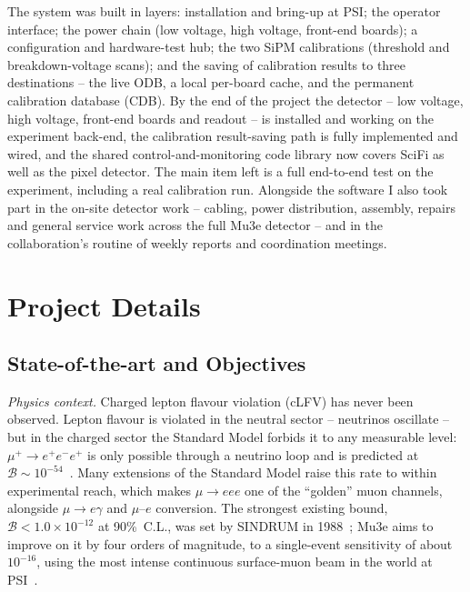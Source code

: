 \documentclass[12pt,a4paper]{article}
\newcommand{\pill}[1]{\textit{#1}\;}   %
\begin{document}
The system was built in layers: installation and bring-up at PSI; the operator
interface; the power chain (low voltage, high voltage, front-end boards); a
configuration and hardware-test hub; the two SiPM calibrations (threshold and
breakdown-voltage scans); and the saving of calibration results to three
destinations -- the live ODB, a local per-board cache, and the permanent
calibration database (CDB). By the end of the project the detector -- low
voltage, high voltage, front-end boards and readout -- is installed and working
on the experiment back-end, the calibration result-saving path is fully
implemented and wired, and the shared control-and-monitoring code library now
covers SciFi as well as the pixel detector. The main item left is a full
end-to-end test on the experiment, including a real calibration run. Alongside
the software I also took part in the on-site detector work -- cabling, power
distribution, assembly, repairs and general service work across the full Mu3e
detector -- and in the collaboration's routine of weekly reports and
coordination meetings.

\clearpage

\section{Project Details}

\subsection{State-of-the-art and Objectives}

\pill{Physics context.}
Charged lepton flavour violation (cLFV) has never been observed. Lepton flavour
is violated in the neutral sector -- neutrinos oscillate -- but in the charged
sector the Standard Model forbids it to any measurable level: $\mu^+ \to
e^+e^-e^+$ is only possible through a neutrino loop and is predicted at
$\mathcal{B} \sim 10^{-54}$~\cite{tdr}. Many extensions of the Standard Model
raise this rate to within experimental reach, which makes $\mu \to eee$ one of
the ``golden'' muon channels, alongside $\mu \to e\gamma$ and $\mu$--$e$
conversion. The strongest existing bound, $\mathcal{B} < 1.0\times10^{-12}$ at
90\%~C.L., was set by SINDRUM in 1988~\cite{sindrum}; Mu3e aims to improve on it
by four orders of magnitude, to a single-event sensitivity of about $10^{-16}$,
using the most intense continuous surface-muon beam in the world at
PSI~\cite{tdr}.
\end{document}
